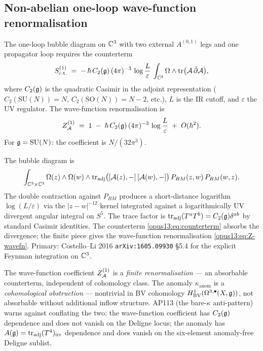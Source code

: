 \subsection{Non-abelian one-loop wave-function renormalisation}
\label{opus13:subsec:wavefn}

\begin{theorem}\ClaimStatusTheorem
\label{opus13:thm:wavefn}
The one-loop bubble diagram on $\mathbb{C}^3$ with two external $A^{(0,1)}$
legs and one propagator loop requires the counterterm
\begin{equation}
  S^{(1)}_{\mathrm{c.t.}}
  \;=\; -\,\hbar\, C_2(\mathfrak{g})\,(4\pi)^{-3}\,\log\frac{L}{\varepsilon}\,
  \int_{\mathbb{C}^3}\Omega\wedge
  \mathrm{tr}\bigl(\mathcal{A}\,\bar\partial\mathcal{A}\bigr),
  \label{opus13:eq:counterterm}
\end{equation}
where $C_2(\mathfrak{g})$ is the quadratic Casimir in the adjoint representation
($C_2(\mathrm{SU}(N)) = N$, $C_2(\mathrm{SO}(N)) = N-2$, etc.), $L$ is
the IR cutoff, and $\varepsilon$ the UV regulator. The wave-function
renormalisation is
\begin{equation}
  Z_{\mathcal{A}}^{(1)} \;=\; 1 \;-\; \hbar\,C_2(\mathfrak{g})\,(4\pi)^{-3}\,\log\frac{L}{\varepsilon}
  \;+\; O(\hbar^2).
  \label{opus13:eq:Z-wavefn}
\end{equation}
For $\mathfrak{g} = \mathrm{SU}(N)$: the coefficient is $N/(32\pi^3)$.
\end{theorem}

\begin{proof-sketch}
The bubble diagram is
\[
  \int_{\mathbb{C}^3\times\mathbb{C}^3} \Omega(z)\wedge\Omega(w)\wedge
  \mathrm{tr}_{\mathrm{adj}}\bigl([\mathcal{A}(z),-]\,[\mathcal{A}(w),-]\bigr)\,
  P_{BM}(z,w)\,P_{BM}(w,z).
\]
The double contraction against $P_{BM}$ produces a short-distance
logarithm $\log(L/\varepsilon)$ via the $|z-w|^{-12}$ kernel integrated
against a logarithmically UV divergent angular integral on $S^5$. The
trace factor is
$\mathrm{tr}_{\mathrm{adj}}(T^a T^b) = C_2(\mathfrak{g})\delta^{ab}$ by
standard Casimir identities. The counterterm
\eqref{opus13:eq:counterterm} absorbs the divergence; the finite piece
gives the wave-function renormalisation \eqref{opus13:eq:Z-wavefn}.
Primary: Costello--Li 2016 \texttt{arXiv:1605.09930} §5.4 for the
explicit Feynman integration on $\mathbb{C}^3$.
\end{proof-sketch}

\begin{remark}\ClaimStatusRemark
\label{opus13:rem:ap113}
The wave-function coefficient $Z_{\mathcal{A}}^{(1)}$ is a \emph{finite
renormalisation} — an absorbable counterterm, independent of
cohomology class. The anomaly $\kappa_{\mathrm{anom}}$ is a
\emph{cohomological obstruction} — nontrivial in BV cohomology
$H^1_{\mathrm{BV}}(\Omega^{3,\bullet}(X,\mathfrak{g}))$, not absorbable without
additional inflow structure. AP113 (the bare-$\kappa$ anti-pattern)
warns against conflating the two: the wave-function coefficient has
$C_2(\mathfrak{g})$ dependence and does not vanish on the Deligne locus; the
anomaly has $A(\mathfrak{g}) = \mathrm{tr}_{\mathrm{adj}}(T^4)_{\mathrm{irr}}$
dependence and does vanish on the six-element anomaly-free Deligne
sublist.
\end{remark}


